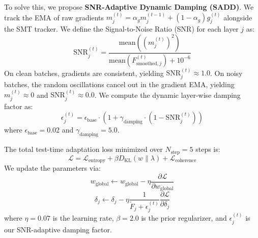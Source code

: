 \documentclass{article}
\theoremstyle{plain}
\theoremstyle{definition}
\theoremstyle{remark}
\begin{document}
To solve this, we propose \textbf{SNR-Adaptive Dynamic Damping (SADD)}. We track the EMA of raw gradients $m_j^{(t)} = \alpha_g m_j^{(t-1)} + (1-\alpha_g) g_j^{(t)}$ alongside the SMT tracker. We define the Signal-to-Noise Ratio (SNR) for each layer $j$ as:
\begin{equation}
    \text{SNR}_j^{(t)} = \frac{\text{mean}\left( (m_j^{(t)})^2 \right)}{\text{mean}\left( F_{\text{smoothed}, j}^{(t)} \right) + 10^{-6}}
\end{equation}
On clean batches, gradients are consistent, yielding $\text{SNR}_j^{(t)} \approx 1.0$. On noisy batches, the random oscillations cancel out in the gradient EMA, yielding $m_j^{(t)} \approx 0$ and $\text{SNR}_j^{(t)} \approx 0.0$. We compute the dynamic layer-wise damping factor as:
\begin{equation}
    \epsilon_j^{(t)} = \epsilon_{\text{base}} \cdot \left( 1 + \gamma_{\text{damping}} \cdot (1 - \text{SNR}_j^{(t)}) \right)
\end{equation}
where $\epsilon_{\text{base}} = 0.02$ and $\gamma_{\text{damping}} = 5.0$.

The total test-time adaptation loss minimized over $N_{\text{step}} = 5$ steps is:
\begin{equation}
    \mathcal{L} = \mathcal{L}_{\text{entropy}} + \beta D_{\text{KL}}(w \| \lambda) + \mathcal{L}_{\text{coherence}}
\end{equation}
We update the parameters via:
\begin{equation}
    w_{\text{global}} \leftarrow w_{\text{global}} - \eta \frac{\partial \mathcal{L}}{\partial w_{\text{global}}}
\end{equation}
\begin{equation}
    \delta_j \leftarrow \delta_j - \eta \frac{1}{\tilde{F}_j + \epsilon_j^{(t)}} \frac{\partial \mathcal{L}}{\partial \delta_j}
\end{equation}
where $\eta = 0.07$ is the learning rate, $\beta = 2.0$ is the prior regularizer, and $\epsilon_j^{(t)}$ is our SNR-adaptive damping factor.
\end{document}
